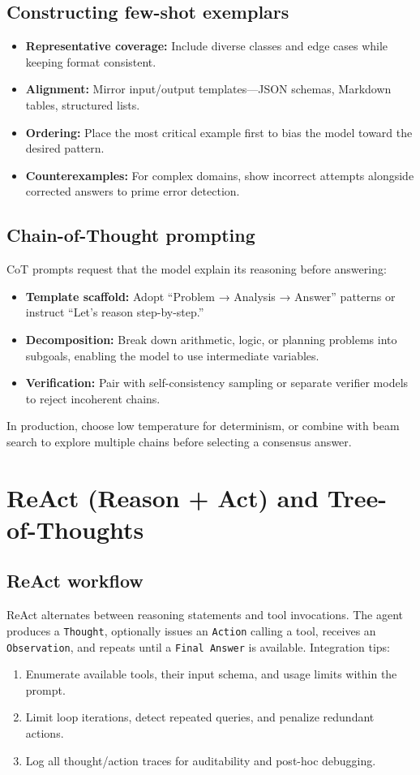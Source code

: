 \documentclass{article}
\begin{document}
\subsection{Constructing few-shot exemplars}
\begin{itemize}
  \item \textbf{Representative coverage:} Include diverse classes and edge cases while keeping format consistent.
  \item \textbf{Alignment:} Mirror input/output templates—JSON schemas, Markdown tables, structured lists.
  \item \textbf{Ordering:} Place the most critical example first to bias the model toward the desired pattern.
  \item \textbf{Counterexamples:} For complex domains, show incorrect attempts alongside corrected answers to prime error detection.
\end{itemize}

\subsection{Chain-of-Thought prompting}
CoT prompts request that the model explain its reasoning before answering:
\begin{itemize}
  \item \textbf{Template scaffold:} Adopt “Problem → Analysis → Answer” patterns or instruct “Let’s reason step-by-step.”
  \item \textbf{Decomposition:} Break down arithmetic, logic, or planning problems into subgoals, enabling the model to use intermediate variables.
  \item \textbf{Verification:} Pair with self-consistency sampling or separate verifier models to reject incoherent chains.
\end{itemize}
In production, choose low temperature for determinism, or combine with beam search to explore multiple chains before selecting a consensus answer.

\section{ReAct (Reason + Act) and Tree-of-Thoughts}
\subsection{ReAct workflow}
ReAct alternates between reasoning statements and tool invocations. The agent produces a \texttt{Thought}, optionally issues an \texttt{Action} calling a tool, receives an \texttt{Observation}, and repeats until a \texttt{Final Answer} is available. Integration tips:
\begin{enumerate}
  \item Enumerate available tools, their input schema, and usage limits within the prompt.
  \item Limit loop iterations, detect repeated queries, and penalize redundant actions.
  \item Log all thought/action traces for auditability and post-hoc debugging.
\end{enumerate}
\end{document}
